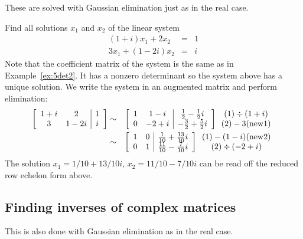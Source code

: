 These are solved with Gaussian elimination just as in the real case. 

\begin{example}
\label{ex:5nonhom} 
Find all solutions $x_1$ and $x_2$ of the linear system 
\begin{eqnarray*}
(1+i) x_1 + 2x_2 & = & 1 \\
3x_1 + (1-2i) x_2 & = & i 
\end{eqnarray*} 
Note that the coefficient matrix of the system is the same as in Example~\ref{ex:5det2}. It has a nonzero determinant so the system above has a unique solution. We write the system in an augmented matrix and perform elimination: 
\begin{eqnarray*}
\left[ \begin{array}{cc|c} 1+i & 2 & 1 \\ 3 & 1-2i & i  \end{array} \right]
& \sim & 
\left[ \begin{array}{cc|c} 1& 1-i & \frac{1}{2} - \frac{1}{2} i \\ 0 & -2+i & -\frac{3}{2} + \frac{5}{2}i 
\end{array} \right]
\begin{array}{c} (1) \div (1+i) \\ (2) -  3({\rm new}1) \end{array} \\
& \sim & 
\left[ \begin{array}{cc|c} 1& 0 & \frac{1}{10} + \frac{13}{10} i \\ 0 & 1 & \frac{11}{10} - \frac{7}{10}i 
\end{array} \right]
\begin{array}{c}  (1) -  (1-i) ({\rm new}2) \\ (2) \div (-2+i)\end{array} 
\end{eqnarray*}
The solution $x_1 = 1/10 + 13/10i$, $x_2 = 11/10 - 7/10 i$ can be read off the reduced row echelon form above. 
\end{example} 

\subsection{Finding inverses of complex matrices} 

This is also done with Gaussian elimination as in the real case.

